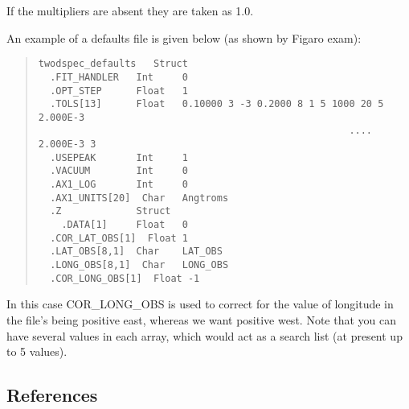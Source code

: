 If the multipliers are absent they are taken as 1.0.

An example of a defaults file is given below (as shown by Figaro exam):
\begin{quote}\begin{verbatim}
twodspec_defaults   Struct
  .FIT_HANDLER   Int     0
  .OPT_STEP      Float   1
  .TOLS[13]      Float   0.10000 3 -3 0.2000 8 1 5 1000 20 5 2.000E-3
                                                      .... 2.000E-3 3
  .USEPEAK       Int     1
  .VACUUM        Int     0
  .AX1_LOG       Int     0
  .AX1_UNITS[20]  Char   Angtroms
  .Z             Struct
    .DATA[1]     Float   0
  .COR_LAT_OBS[1]  Float 1
  .LAT_OBS[8,1]  Char    LAT_OBS
  .LONG_OBS[8,1]  Char   LONG_OBS
  .COR_LONG_OBS[1]  Float -1
\end{verbatim}\end{quote}
In this case COR\_LONG\_OBS is used to correct for the value of
longitude in the file's being positive east, whereas we want positive
west. Note that you can have several values in each array, which would
act as a search list (at present up to 5 values).

\newpage
\subsection{References}

